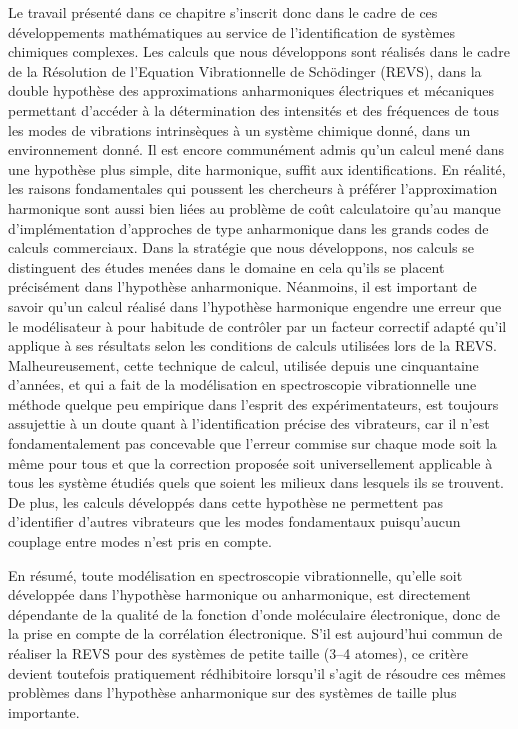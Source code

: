 \documentclass[12pt,a4paper]{book}
\begin{document}
Le travail présenté dans ce chapitre s'inscrit donc dans le cadre de ces développements mathématiques au service de l'identification de systèmes chimiques complexes. Les calculs que nous développons sont réalisés dans le cadre de la Résolution de l'Equation Vibrationnelle de Sch\"{o}dinger (REVS), dans la double hypothèse des approximations anharmoniques électriques et mécaniques permettant d'accéder à la détermination des intensités et des fréquences de tous les modes de vibrations intrinsèques à un système chimique donné, dans un environnement donné. Il est encore communément admis qu'un calcul mené dans une hypothèse plus simple, dite harmonique, suffit aux identifications. En réalité, les raisons fondamentales qui poussent les chercheurs à préférer l'approximation harmonique sont aussi bien liées au problème de coût calculatoire qu'au manque d'implémentation d'approches de type anharmonique dans les grands codes de calculs commerciaux. Dans la stratégie que nous développons, nos calculs se distinguent des études menées dans le domaine en cela qu'ils se placent précisément dans l'hypothèse anharmonique. Néanmoins, il est important de savoir qu'un calcul réalisé dans l'hypothèse harmonique engendre une erreur que le modélisateur à pour habitude de \og contrôler \fg{} par un facteur correctif adapté qu'il applique à ses résultats selon les conditions de calculs utilisées lors de la REVS. Malheureusement, cette technique de calcul, utilisée depuis une cinquantaine d'années, et qui a fait de la modélisation en spectroscopie vibrationnelle une méthode quelque peu empirique dans l'esprit des expérimentateurs, est toujours assujettie à un doute quant à l'identification précise des vibrateurs, car il n'est fondamentalement pas concevable que l'erreur commise sur chaque mode soit la même pour tous et que la correction proposée soit universellement applicable à tous les système étudiés quels que soient les milieux dans lesquels ils se trouvent. De plus, les calculs développés dans cette hypothèse ne permettent pas d'identifier d'autres vibrateurs que les modes fondamentaux puisqu'aucun couplage entre modes n'est pris en compte.

En résumé, toute modélisation en spectroscopie vibrationnelle, qu’elle soit développée dans l’hypothèse harmonique ou anharmonique, est directement dépendante de la qualité de la fonction d’onde moléculaire électronique, donc de la prise en compte de la corrélation électronique. S’il est aujourd’hui commun de réaliser la REVS pour des systèmes de petite taille (3--4 atomes), ce critère devient toutefois pratiquement rédhibitoire lorsqu'il s'agit de résoudre ces mêmes problèmes dans l’hypothèse anharmonique sur des systèmes de taille plus importante.
\end{document}
